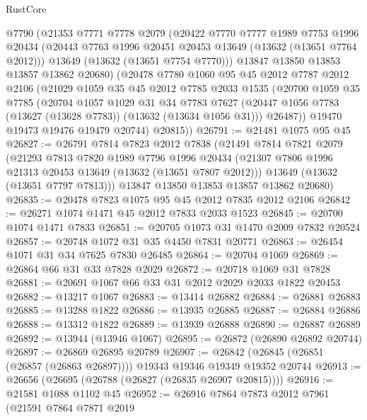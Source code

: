 \begin{lexlean}{RustCore}
\begin{coremodule}
      @7790
      (@21353
        @7771
        @7778
        @2079
        (@20422
          @7770
          @7777
          @1989
          @7753
          @1996
          @20434
          (@20443 @7763 @1996 @20451 @20453 @13649 (@13632 (@13651 @7764 @2012)))
          @13649
          (@13632 (@13651 @7754 @7770)))
        @13847
        @13850
        @13853
        @13857
        @13862
        @20680)
      (@20478
        @7780
        @1060
        @95
        @45
        @2012
        @7787
        @2012
        @2106
        (@21029
          @1059
          @35
          @45
          @2012
          @7785
          @2033
          @1535
          (@20700
            @1059
            @35
            @7785
            (@20704
              @1057
              @1029
              @31
              @34
              @7783
              @7627
              (@20447 @1056 @7783 (@13627 (@13628 @7783)) (@13632 (@13634 @1056 @31)))
              @26487))
          @19470
          @19473
          @19476
          @19479
          @20744)
        @20815))
@26791 := @21481 @1075 @95 @45
@26827 := @26791
    @7814
    @7823
    @2012
    @7838
    (@21491
      @7814
      @7821
      @2079
      (@21293
        @7813
        @7820
        @1989
        @7796
        @1996
        @20434
        (@21307 @7806 @1996 @21313 @20453 @13649 (@13632 (@13651 @7807 @2012)))
        @13649
        (@13632 (@13651 @7797 @7813)))
      @13847
      @13850
      @13853
      @13857
      @13862
      @20680)
@26835 := @20478 @7823 @1075 @95 @45 @2012 @7835 @2012 @2106
@26842 := @26271 @1074 @1471 @45 @2012 @7833 @2033 @1523
@26845 := @20700 @1074 @1471 @7833
@26851 := @20705 @1073 @31 @1470 @2009 @7832 @20524
@26857 := @20748 @1072 @31 @35 @4450 @7831 @20771
@26863 := @26454 @1071 @31 @34 @7625 @7830 @26485
@26864 := @20704 @1069
@26869 := @26864 @66 @31 @33 @7828 @2029
@26872 := @20718 @1069 @31 @7828
@26881 := @20691 @1067 @66 @33 @31 @2012 @2029 @2033 @1822 @20453
@26882 := @13217 @1067
@26883 := @13414 @26882
@26884 := @26881 @26883
@26885 := @13288 @1822
@26886 := @13935 @26885
@26887 := @26884 @26886
@26888 := @13312 @1822
@26889 := @13939 @26888
@26890 := @26887 @26889
@26892 := @13944 (@13946 @1067)
@26895 := @26872 (@26890 @26892 @20744)
@26897 := @26869 @26895 @20789
@26907 := @26842 (@26845 (@26851 (@26857 (@26863 @26897)))) @19343 @19346 @19349 @19352 @20744
@26913 := @26656 (@26695 (@26788 (@26827 (@26835 @26907 @20815))))
@26916 := @21581 @1088 @1102 @45
@26952 := @26916
    @7864
    @7873
    @2012
    @7961
    (@21591
      @7864
      @7871
      @2019

\end{coremodule}
\end{lexlean}
